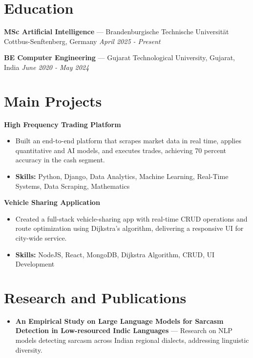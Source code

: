 \documentclass[a4paper,10pt]{article}
\begin{document}
\section*{Education}
\textbf{MSc Artificial Intelligence} — Brandenburgische Technische Universität Cottbus-Senftenberg, Germany \hfill \textit{April 2025 - Present}\par
\vspace{1.5pt}
\textbf{BE Computer Engineering} — Gujarat Technological University, Gujarat, India \hfill \textit{June 2020 - May 2024}\par

\section*{Main Projects}
\textbf{High Frequency Trading Platform}\par
\vspace{1pt}
\begin{itemize}
  \item Built an end-to-end platform that scrapes market data in real time, applies quantitative and AI models, and executes trades, achieving 70 percent accuracy in the cash segment.
  \item \textbf{Skills:} Python, Django, Data Analytics, Machine Learning, Real-Time Systems, Data Scraping, Mathematics
\end{itemize}
\vspace{3pt}
\textbf{Vehicle Sharing Application}\par
\vspace{1pt}
\begin{itemize}
  \item Created a full-stack vehicle-sharing app with real-time CRUD operations and route optimization using Dijkstra's algorithm, delivering a responsive UI for city-wide service.
  \item \textbf{Skills:} NodeJS, React, MongoDB, Dijkstra Algorithm, CRUD, UI Development
\end{itemize}

\section*{Research and Publications}
\begin{itemize}
\item \textbf{An Empirical Study on Large Language Models for Sarcasm Detection in Low-resourced Indic Languages} — Research on NLP models detecting sarcasm across Indian regional dialects, addressing linguistic diversity.
\end{itemize}
\end{document}
